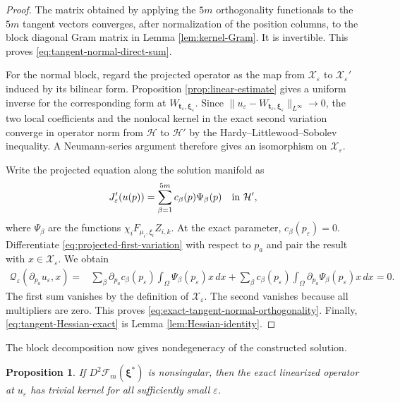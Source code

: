 \documentclass[11pt]{article}
\newtheorem{proposition}[theorem]{Proposition}
\numberwithin{equation}{section}
\begin{document}
\begin{proof}
The matrix obtained by applying the $5m$ orthogonality functionals
to the $5m$ tangent vectors converges, after normalization of the
position columns, to the block diagonal Gram matrix in Lemma
\ref{lem:kernel-Gram}. It is invertible. This proves
\eqref{eq:tangent-normal-direct-sum}.

For the normal block, regard the projected operator as the map from
$\mathcal X_\varepsilon$ to $\mathcal X_\varepsilon'$ induced by its
bilinear form. Proposition \ref{prop:linear-estimate} gives a uniform
inverse for the corresponding form at
$W_{\boldsymbol t_\varepsilon,\boldsymbol\xi_\varepsilon}$. Since
$\|u_\varepsilon-W_{\boldsymbol t_\varepsilon,
\boldsymbol\xi_\varepsilon}\|_{L^\infty}\to0$, the two local
coefficients and the nonlocal kernel in the exact second variation
converge in operator norm from $\mathcal H$ to $\mathcal H'$ by the
Hardy--Littlewood--Sobolev inequality. A Neumann-series argument
therefore gives an isomorphism on $\mathcal X_\varepsilon$.

Write the projected equation along the solution manifold as
\begin{equation}\label{eq:projected-first-variation}
J_\varepsilon'(u(p))
=\sum_{\beta=1}^{5m}c_\beta(p)\Psi_\beta(p)
\quad\hbox{in }\mathcal H',
\end{equation}
where $\Psi_\beta$ are the functions
$\chi_iF_{\mu_i,\xi_i}Z_{i,k}$. At the exact parameter,
$c_\beta(p_\varepsilon)=0$. Differentiate
\eqref{eq:projected-first-variation} with respect to $p_a$ and pair
the result with $x\in\mathcal X_\varepsilon$. We obtain
\begin{equation*}
\begin{aligned}
\mathcal Q_\varepsilon(\partial_{p_a}u_\varepsilon,x)
={}&\sum_\beta
\partial_{p_a}c_\beta(p_\varepsilon)
\int_\Omega\Psi_\beta(p_\varepsilon)x\,dx +\sum_\beta c_\beta(p_\varepsilon)
\int_\Omega\partial_{p_a}\Psi_\beta(p_\varepsilon)x\,dx=0.
\end{aligned}
\end{equation*}
The first sum vanishes by the definition of
$\mathcal X_\varepsilon$. The second vanishes because all multipliers
are zero. This proves
\eqref{eq:exact-tangent-normal-orthogonality}. Finally,
\eqref{eq:tangent-Hessian-exact} is Lemma
\ref{lem:Hessian-identity}.
\end{proof}

The block decomposition now gives nondegeneracy of the constructed solution.

\begin{proposition}\label{prop:nondegenerate-branch}
If $D^2\mathcal F_m(\boldsymbol\xi^*)$ is nonsingular, then the exact linearized operator at $u_\varepsilon$ has trivial kernel for all sufficiently small $\varepsilon$.
\end{proposition}
\end{document}
